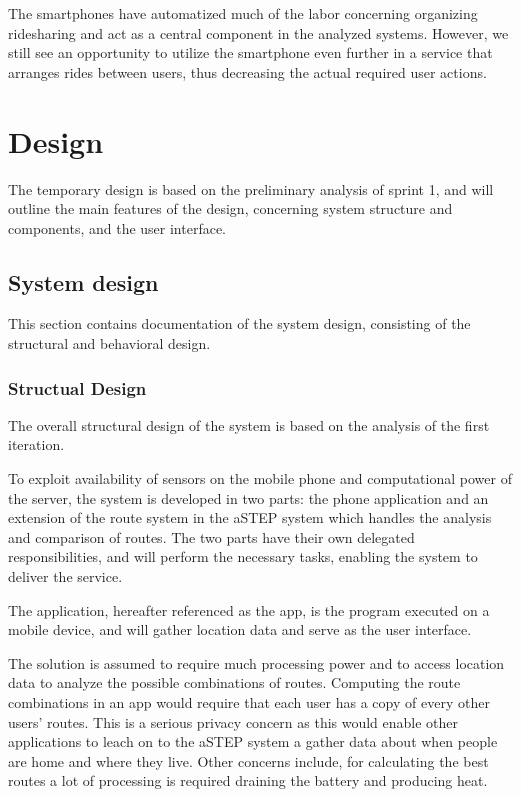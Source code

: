 The smartphones have automatized much of the labor concerning organizing ridesharing and act as a central component in the analyzed systems.
However, we still see an opportunity to utilize the smartphone even further in a service that arranges rides between users, thus decreasing the actual required user actions.

\section{Design}\label{sprint1design}
The temporary design is based on the preliminary analysis of sprint 1, and will outline the main features of the design, concerning system structure and components, and the user interface.

\subsection{System design}
This section contains documentation of the system design, consisting of the structural and behavioral design.

\subsubsection{Structual Design}
The overall structural design of the system is based on the analysis of the first iteration.

To exploit availability of sensors on the mobile phone and computational power of the server, the system is developed in two parts: the phone application and an extension of the route system in the aSTEP system which handles the analysis and comparison of routes.
The two parts have their own delegated responsibilities, and will perform the necessary tasks, enabling the system to deliver the service.

The application, hereafter referenced as the app, is the program executed on a mobile device, and will gather location data and serve as the user interface. 

The solution is assumed to require much processing power and to access location data to analyze the possible combinations of routes.
Computing the route combinations in an app would require that each user has a copy of every other users' routes.
This is a serious privacy concern as this would enable other applications to leach on to the aSTEP system a gather data about when people are home and where they live.
Other concerns include, for calculating the best routes a lot of processing is required draining the battery and producing heat.

